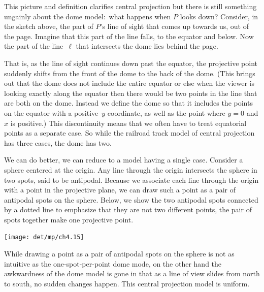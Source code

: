 This picture and definition
clarifies central projection
but there is still something ungainly about the dome 
model:~what happens when $P$ looks down?
Consider, in the sketch above, the part of $P$'s line of sight 
that comes up towards us, out of the page.
Imagine that this part of the line falls, to the equator and
below.
Now the part of the line~$\ell$ that intersects the dome lies behind the page.  

That is, as
the line of sight continues down past the equator, the projective point
suddenly shifts from the front of the dome to the back of the dome.
(This brings out that the dome does not include the entire equator
or else
when the viewer is looking exactly along the equator then there would be 
two points in the line that are both on the dome. 
Instead we define the dome so that it includes the
points on the equator with a positive~$y$ coordinate, as well as the point
where $y=0$ and $x$ is positive.)
This discontinuity means that
we often have to treat equatorial points as a separate case.
So while the railroad track model of central projection
has three cases, the dome has two.

We can do better, we can reduce to a model having a single case.
Consider a sphere centered at the origin.
Any line through the origin intersects the sphere in two spots, said to be
antipodal.
Because we associate each line through the origin 
with a point in the projective 
plane, we can draw such a point as a pair of antipodal spots on the sphere. 
Below, we show the two antipodal spots connected by a dotted line
to emphasize that they are not two 
different points, the pair of spots together make one projective point.
\begin{center}
  \texttt{[image: det/mp/ch4.15]}
\end{center}
While drawing a point as a pair of antipodal 
spots on the sphere is not as intuitive as the one-spot-per-point dome mode,
on the other hand
the awkwardness of the dome model is gone in that 
as a line of view slides from north to south, 
no sudden changes happen.
This central projection model is uniform.

